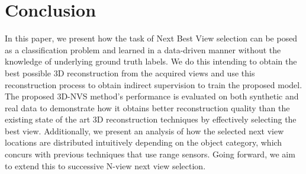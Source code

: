 \section{Conclusion}
In this paper, we present how the task of Next Best View selection can be posed as a classification problem and learned in a data-driven manner without the knowledge of underlying ground truth labels.
We do this intending to obtain the best possible 3D reconstruction from the acquired views and use this reconstruction process to obtain indirect supervision to train the proposed model.
The proposed 3D-NVS method's performance is evaluated on both synthetic and real data to demonstrate how it obtains better reconstruction quality than the existing state of the art 3D reconstruction techniques by effectively selecting the best view.
Additionally, we present an analysis of how the selected next view locations are distributed intuitively depending on the object category, which concurs with previous techniques that use range sensors.
Going forward, we aim to extend this to successive N-view next view selection.